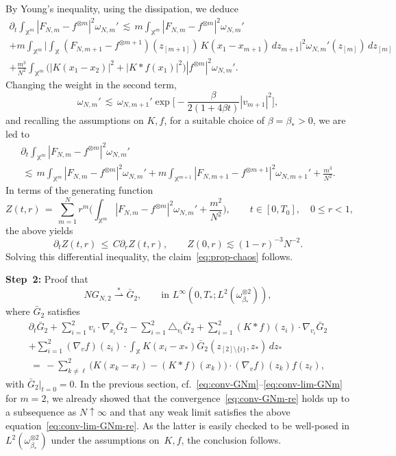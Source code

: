 \documentclass[a4paper,11pt,reqno,noindent]{amsart}
\theoremstyle{plain}
\theoremstyle{definition}
\numberwithin{equation}{section}
\newcommand{\Xd}{\mathbb X}
\begin{document}
By Young's inequality, using the dissipation, we deduce
\begin{multline*}
\partial_t\int_{\Xd^m}|F_{N,m}-f^{\otimes m}|^2\omega_{N,m}'
\,\lesssim\,
m\int_{\Xd^m}|F_{N,m}-f^{\otimes m}|^2\omega_{N,m}'\\
+m\int_{\Xd^{m}}\Big|\int_\Xd (F_{N,m+1}-f^{\otimes m+1})(z_{[m+1]})\,K(x_1-x_{m+1})\,dz_{m+1}\Big|^2\omega_{N,m}'(z_{[m]})\,dz_{[m]}\\
+\frac{m^3}{N^2}\int_{\Xd^m}\Big(|K(x_1-x_2)|^2+|K\ast f(x_1)|^2\Big)|f^{\otimes m}|^2\omega_{N,m}'.
\end{multline*}
Changing the weight in the second term,
\[\omega_{N,m}'\,\lesssim\,\omega_{N,m+1}'\exp\Big[-\frac\beta{2(1+4\beta t)}|v_{m+1}|^2\Big],\]
and recalling the assumptions on $K,f$, for a suitable choice of $\beta=\beta_*>0$, we are led to
\begin{multline*}
\partial_t\int_{\Xd^m}|F_{N,m}-f^{\otimes m}|^2\omega_{N,m}'\\[-2mm]
\,\lesssim\,
m\int_{\Xd^m}|F_{N,m}-f^{\otimes m}|^2\omega_{N,m}'
+m\int_{\Xd^{m+1}}|F_{N,m+1}-f^{\otimes m+1}|^2\omega_{N,m+1}'
+\frac{m^3}{N^2}.
\end{multline*}
In terms of the generating function
\[Z(t,r)\,=\,\sum_{m=1}^Nr^m\bigg(\int_{\Xd^m}|F_{N,m}-f^{\otimes m}|^2\omega_{N,m}'+\frac{m^2}{N^2}\bigg),\qquad t\in[0,T_0],\quad 0\le r<1,\]
the above yields
\begin{equation*}
\partial_tZ(t,r)\,\le\,
C\partial_rZ(t,r),\qquad Z(0,r)\lesssim(1-r)^{-3}N^{-2}.
\end{equation*}
Solving this differential inequality, the claim~\eqref{eq:prop-chaos} follows.


\medskip\noindent
{\bf Step~2:} Proof that
\begin{equation}\label{eq:conv-GNm-re}
NG_{N,2}\overset*\rightharpoonup \bar G_2,\qquad\text{in $L^\infty(0,T_*;L^2(\omega_{\beta_*}^{\otimes 2}))$},
\end{equation}
where $\bar G_2$ satisfies
\begin{multline}\label{eq:conv-lim-GNm-re}
\partial_t \bar G_2
+\sum_{i=1}^2v_i\cdot\nabla_{x_i}\bar G_2
-\sum_{i=1}^2\triangle_{v_i}\bar G_2
+\sum_{i=1}^2 (K\ast f)(z_i)\cdot\nabla_{v_i}\bar G_{2}\\
+\sum_{i=1}^2(\nabla_{v}f)(z_i)\cdot\int_{\Xd}K(x_i-x_*)\bar G_2(z_{[2]\setminus\{i\}},z_*)\,d z_*\\
\,=\,
-\sum_{k\ne\ell}^2\Big(K(x_k-x_\ell)-(K\ast f)(x_k)\Big)\cdot(\nabla_vf)(z_k)f(z_\ell),
\end{multline}
with $\bar G_2|_{t=0}=0$.
In the previous section, cf.~\eqref{eq:conv-GNm}--\eqref{eq:conv-lim-GNm} for $m=2$, we already showed that the convergence~\eqref{eq:conv-GNm-re} holds up to a subsequence as $N\uparrow\infty$ and that any weak limit satisfies the above equation~\eqref{eq:conv-lim-GNm-re}. As the latter is easily checked to be well-posed in $L^2(\omega_{\beta_*}^{\otimes2})$ under the assumptions on~$K,f$, the conclusion follows.
\end{document}
